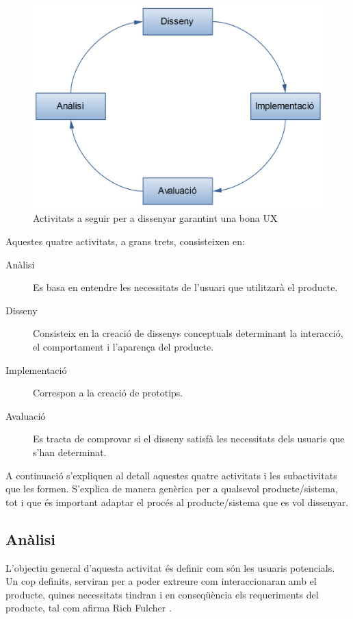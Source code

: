 \begin{figure}[htp]
\centering
\includegraphics[scale=0.6]{UX_wheel.png}
\caption{Activitats a seguir per a dissenyar garantint una bona \ac{UX}}\label{fig:UX_lifecycle}
\end{figure}

Aquestes quatre activitats, a grans trets, consisteixen en:
\begin{description}
\item [Anàlisi] Es basa en entendre les necessitats de l'usuari que utilitzarà el producte.
\item [Disseny] Consisteix en la creació de dissenys conceptuals determinant la interacció, el comportament i l'aparença del producte.
\item [Implementació] Correspon a la creació de prototips.
\item [Avaluació] Es tracta de comprovar si el disseny satisfà les necessitats dels usuaris que s'han determinat.
\end{description}

A continuació s'expliquen al detall aquestes quatre activitats i les subactivitats que les formen. S'explica de manera genèrica per a qualsevol producte/sistema, tot i que és important adaptar el procés al producte/sistema que es vol dissenyar.

\subsection{Anàlisi}\label{sec:analisi}
L'objectiu general d'aquesta activitat és definir com són les usuaris potencials. Un cop definits, serviran per a poder extreure com interaccionaran amb el producte, quines necessitats tindran i en conseqüència els requeriments del producte, tal com afirma Rich Fulcher \cite{user_centred_design}.

